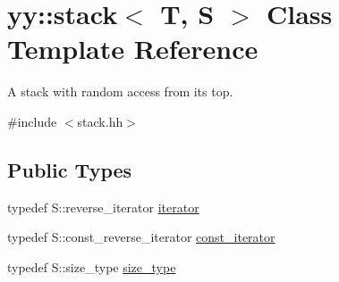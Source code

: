 \hypertarget{classyy_1_1stack}{\section{yy\-:\-:stack$<$ T, S $>$ Class Template Reference}
\label{classyy_1_1stack}
}


A stack with random access from its top.  




{\ttfamily \#include $<$stack.\-hh$>$}

\subsection*{Public Types}
\begin{DoxyCompactItemize}
\item 
typedef S\-::reverse\-\_\-iterator \hyperlink{classyy_1_1stack_a959921144f243952520a2178121cbe6f}{iterator}
\item 
typedef S\-::const\-\_\-reverse\-\_\-iterator \hyperlink{classyy_1_1stack_a0cab3a74b0947ce6de68c3520b9229ab}{const\-\_\-iterator}
\item 
typedef S\-::size\-\_\-type \hyperlink{classyy_1_1stack_a691214fce87b366b08f7ceb4217d6f27}{size\-\_\-type}
\end{DoxyCompactItemize}
